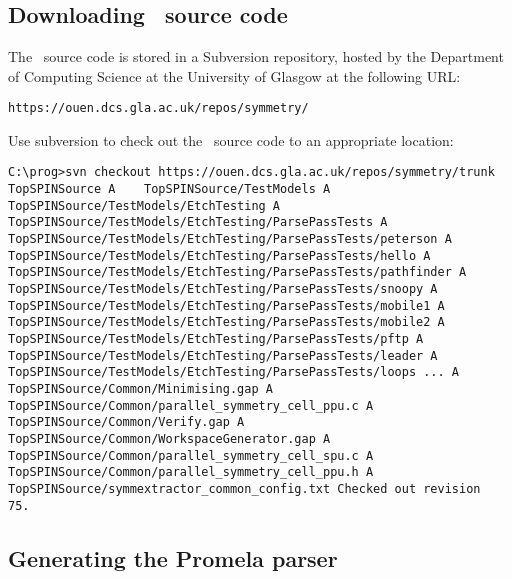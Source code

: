 \chapter{\buildingfromsource}\label{chapter:compilingfromsource}


\section{Downloading \protect\topspin\ source
code}\label{sec:compilingfromsource:downloading}

The \topspin\ source code is stored in a Subversion repository,
hosted by the Department of Computing Science at the University of
Glasgow at the following URL:
%
\begin{lstlisting}
https://ouen.dcs.gla.ac.uk/repos/symmetry/
\end{lstlisting}
%
Use subversion to check out the \topspin\ source code to an
appropriate location:
%
\begin{lstlisting}
C:\prog>svn checkout https://ouen.dcs.gla.ac.uk/repos/symmetry/trunk
TopSPINSource A    TopSPINSource/TestModels A
TopSPINSource/TestModels/EtchTesting A
TopSPINSource/TestModels/EtchTesting/ParsePassTests A
TopSPINSource/TestModels/EtchTesting/ParsePassTests/peterson A
TopSPINSource/TestModels/EtchTesting/ParsePassTests/hello A
TopSPINSource/TestModels/EtchTesting/ParsePassTests/pathfinder A
TopSPINSource/TestModels/EtchTesting/ParsePassTests/snoopy A
TopSPINSource/TestModels/EtchTesting/ParsePassTests/mobile1 A
TopSPINSource/TestModels/EtchTesting/ParsePassTests/mobile2 A
TopSPINSource/TestModels/EtchTesting/ParsePassTests/pftp A
TopSPINSource/TestModels/EtchTesting/ParsePassTests/leader A
TopSPINSource/TestModels/EtchTesting/ParsePassTests/loops ... A
TopSPINSource/Common/Minimising.gap A
TopSPINSource/Common/parallel_symmetry_cell_ppu.c A
TopSPINSource/Common/Verify.gap A
TopSPINSource/Common/WorkspaceGenerator.gap A
TopSPINSource/Common/parallel_symmetry_cell_spu.c A
TopSPINSource/Common/parallel_symmetry_cell_ppu.h A
TopSPINSource/symmextractor_common_config.txt Checked out revision
75.
\end{lstlisting}

\section{Generating the Promela parser}\label{sec:compilingfromsource:generating}

